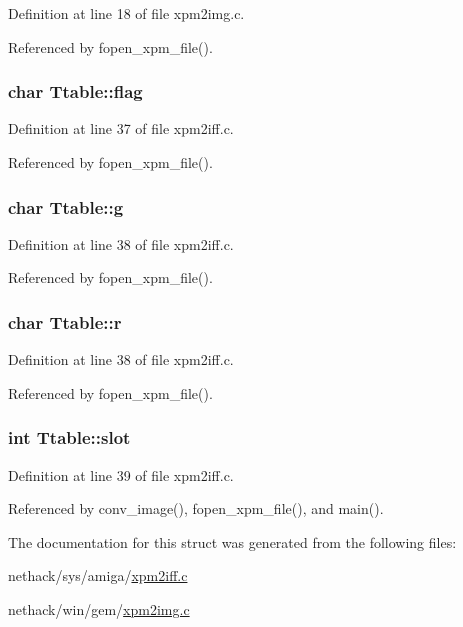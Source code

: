 Definition at line 18 of file xpm2img.\+c.



Referenced by fopen\+\_\+xpm\+\_\+file().

\hypertarget{structTtable_ada8267088c0519d324397d9535813595}{
\subsubsection[{flag}]{\setlength{\rightskip}{0pt plus 5cm}char Ttable\+::flag}}\label{structTtable_ada8267088c0519d324397d9535813595}


Definition at line 37 of file xpm2iff.\+c.



Referenced by fopen\+\_\+xpm\+\_\+file().

\hypertarget{structTtable_a44113f8a7850eff86b7b3039d31205d8}{
\subsubsection[{g}]{\setlength{\rightskip}{0pt plus 5cm}char Ttable\+::g}}\label{structTtable_a44113f8a7850eff86b7b3039d31205d8}


Definition at line 38 of file xpm2iff.\+c.



Referenced by fopen\+\_\+xpm\+\_\+file().

\hypertarget{structTtable_a0b8822f1f2ff03ca76464d9f181da5d0}{
\subsubsection[{r}]{\setlength{\rightskip}{0pt plus 5cm}char Ttable\+::r}}\label{structTtable_a0b8822f1f2ff03ca76464d9f181da5d0}


Definition at line 38 of file xpm2iff.\+c.



Referenced by fopen\+\_\+xpm\+\_\+file().

\hypertarget{structTtable_ad02a3434456dfb79c9fb5b055e9664b9}{
\subsubsection[{slot}]{\setlength{\rightskip}{0pt plus 5cm}int Ttable\+::slot}}\label{structTtable_ad02a3434456dfb79c9fb5b055e9664b9}


Definition at line 39 of file xpm2iff.\+c.



Referenced by conv\+\_\+image(), fopen\+\_\+xpm\+\_\+file(), and main().



The documentation for this struct was generated from the following files\+:\begin{DoxyCompactItemize}
\item 
nethack/sys/amiga/\hyperlink{xpm2iff_8c}{xpm2iff.\+c}\item 
nethack/win/gem/\hyperlink{xpm2img_8c}{xpm2img.\+c}\end{DoxyCompactItemize}
